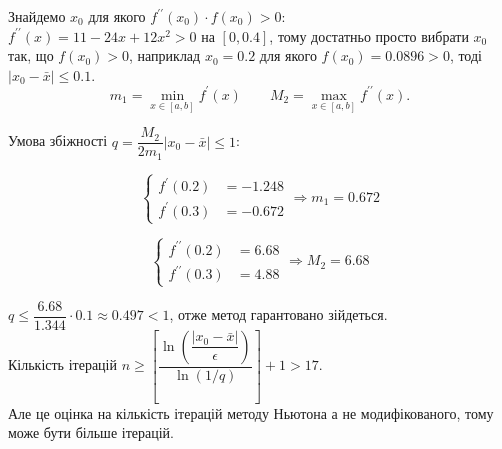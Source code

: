 Знайдемо $x_0$ для якого $f^{\prime\prime}(x_0)\cdot f(x_0) > 0$: \\

$f^{\prime\prime}(x) = 11 - 24 x + 12 x^2 > 0$ на $[0, 0.4]$, тому достатньо просто вибрати $x_0$ так, що $f(x_0) > 0$, наприклад $x_0 = 0.2$ для якого $f(x_0) = 0.0896 > 0$, тоді $|x_0 - \bar x| \le 0.1$. \\

\[ m_1 = \min_{x \in [a, b]} f^\prime(x) \qquad M_2 = \max_{x \in [a, b]} f^{\prime\prime}(x). \]

Умова збіжності $q = \dfrac{M_2}{2m_1} |x_0 - \bar x| \le 1$:

\begin{equation*}
    \left\{
        \begin{aligned}
            f^\prime(0.2) &= -1.248 \\
            f^\prime(0.3) &= -0.672
        \end{aligned}
    \right.
    \Rightarrow m_1 = 0.672
\end{equation*}

\begin{equation*}
    \left\{
        \begin{aligned}
            f^{\prime\prime}(0.2) &= 6.68 \\
            f^{\prime\prime}(0.3) &= 4.88
        \end{aligned}
    \right.
    \Rightarrow M_2 = 6.68
\end{equation*}

$q \le \dfrac{6.68}{1.344} \cdot 0.1 \approx 0.497 < 1$, отже метод гарантовано зійдеться. \\

Кількість ітерацій $n \ge \left[ \dfrac{\ln \left(\dfrac{|x_0 - \bar x|}{\epsilon}\right)}{\ln (1/q)} \right] + 1 > 17$. \\

Але це оцінка на кількість ітерацій методу Ньютона а не модифікованого, тому може бути більше ітерацій. \\

